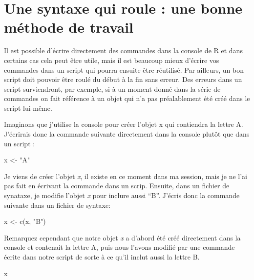 \documentclass[
]{book}
\newenvironment{Shaded}{\begin{snugshade}}{\end{snugshade}}
\newcommand{\FunctionTok}[1]{\textcolor[rgb]{0.00,0.00,0.00}{#1}}
\newcommand{\NormalTok}[1]{#1}
\newcommand{\OtherTok}[1]{\textcolor[rgb]{0.56,0.35,0.01}{#1}}
\newcommand{\StringTok}[1]{\textcolor[rgb]{0.31,0.60,0.02}{#1}}
\begin{document}
\hypertarget{une-syntaxe-qui-roule-une-bonne-muxe9thode-de-travail}{%
\section{Une syntaxe qui roule : une bonne méthode de travail}\label{une-syntaxe-qui-roule-une-bonne-muxe9thode-de-travail}}

Il est possible d'écrire directement des commandes dans la console de R et dans certains cas cela peut être utile, mais il est beaucoup mieux d'écrire vos commandes dans un script qui pourra ensuite être réutilisé. Par ailleurs, un bon script doit pouvoir être roulé du début à la fin sans erreur. Des erreurs dans un script surviendront, par exemple, si à un moment donné dans la série de commandes on fait référence à un objet qui n'a pas préalablement été créé dans le script lui-même.

Imaginons que j'utilise la console pour créer l'objet x qui contiendra la lettre A. J'écrirais donc la commande suivante directement dans la console plutôt que dans un script :

\begin{Shaded}
\begin{Highlighting}[]
\NormalTok{x }\OtherTok{\textless{}{-}} \StringTok{"A"}
\end{Highlighting}
\end{Shaded}

Je viens de créer l'objet \emph{x}, il existe en ce moment dans ma session, mais je ne l'ai pas fait en écrivant la commande dans un scrip. Ensuite, dans un fichier de synataxe, je modifie l'objet \emph{x} pour inclure aussi ``B''. J'écris donc la commande suivante dans un fichier de syntaxe:

\begin{Shaded}
\begin{Highlighting}[]
\NormalTok{x }\OtherTok{\textless{}{-}} \FunctionTok{c}\NormalTok{(x, }\StringTok{"B"}\NormalTok{)}
\end{Highlighting}
\end{Shaded}

Remarquez cependant que notre objet \emph{x} a d'abord été créé directement dans la console et contenait la lettre A, puis nous l'avons modifié par une commande écrite dans notre script de sorte à ce qu'il inclut aussi la lettre B.

\begin{Shaded}
\begin{Highlighting}[]
\NormalTok{x}
\end{Highlighting}
\end{Shaded}
\end{document}

